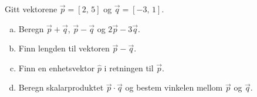 %
Gitt vektorene $\vec{p} = [2,\,5]$ og $\vec{q} = [-3,\,1]$.
\begin{enumerate}[a)]
    \item Beregn $\vec{p} + \vec{q}$, $\vec{p} - \vec{q}$ og $2\vec{p} - 3\vec{q}$.
    \item Finn lengden til vektoren $\vec{p} - \vec{q}$.
    \item Finn en enhetsvektor $\hat{p}$ i retningen til $\vec{p}$.
    \item Beregn skalarproduktet $\vec{p}\cdot\vec{q}$ og bestem vinkelen mellom $\vec{p}$ og $\vec{q}$.
\end{enumerate}
